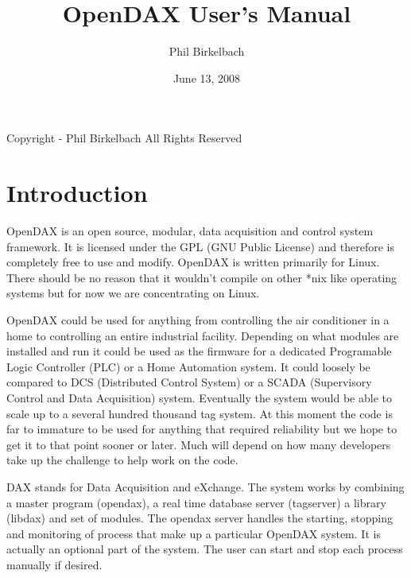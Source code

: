 

\title{OpenDAX User's Manual}
\date{June 13, 2008}
\author{Phil Birkelbach}



	\maketitle

	\begin{flushleft}
		Copyright  - Phil Birkelbach\linebreak
		All Rights Reserved
	\end{flushleft}

	\tableofcontents
	\newpage
	\chapter{Introduction}
	OpenDAX is an open source, modular, data acquisition and control system
	framework. It is licensed under the GPL (GNU Public License) and therefore is
	completely free to use and modify. OpenDAX is written primarily for Linux.
	There should be no reason that it wouldn't compile on other *nix like operating
	systems but for now we are concentrating on Linux.

	OpenDAX could be used for anything from controlling the air conditioner in a
	home to controlling an entire industrial facility. Depending on what modules are
	installed and run it could be used as the firmware for a dedicated Programable
	Logic Controller (PLC) or a Home Automation system. It could loosely be compared
	to DCS (Distributed Control System) or a SCADA (Supervisory Control and Data
	Acquisition) system. Eventually the system would be able to scale up to a
	several hundred thousand tag system. At this moment the code is far to immature
	to be used for anything that required reliability but we hope to get it to that
	point sooner or later. Much will depend on how many developers take up the
	challenge to help work on the code.

	DAX stands for Data Acquisition and eXchange. The system works by combining a
	master program (opendax), a real time database server (tagserver) a library
	(libdax) and set of modules. The opendax server handles the starting, stopping
	and monitoring of process that make up a particular OpenDAX system.  It is
	actually an optional part of the system.  The user can start and stop each
	process manually if desired.

